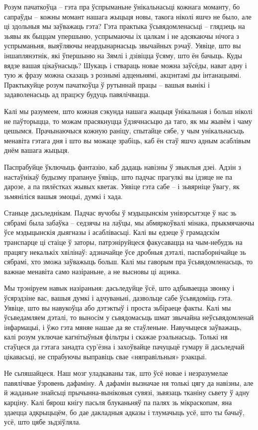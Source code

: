 Розум пачаткоўца – гэта пра ўспрыманьне ўнікальнасьці кожнага моманту, бо сапраўды – кожны момант нашага жыцьця новы, такога ніколі яшчэ не было, але ці здольныя мы заўважаць гэта? Гэта практыка ўсьвядомленасьці – глядзець на зьявы як быццам упершыню, успрымаючы іх цалкам і не адсякаючы нічога з успрыманьня, выяўляючы неардынарнасьць звычайных рэчаў. Уявіце, што вы іншаплянэтнік, які ўпершыню на Зямлі і дзівіцца ўсяму, што ён бачыць. Куды вядзе вашая цікаўнасьць? Шукаць і ствараць новае можна заўсёды, нават адну і тую ж фразу можна сказаць з рознымі адценьнямі, акцэнтамі ды інтанацыямі. Практыкуйце розум пачаткоўца ў рутыннай працы – вашыя вынікі і задаволенасьць ад працэсу будуць павялічвацца. 

Калі мы разумеем, што кожная сэкунда нашага жыцьця ўнікальная і больш ніколі не паўторыцца, то можам прасякнуцца ўдзячнасьцю да таго, як мы жывём і чаму цешымся. Прачынаючыся кожную раніцу, спытайце сябе, у чым унікальнасьць менавіта гэтага дня і што вы можаце зрабіць, каб ён стаў яшчэ адным асаблівым днём вашага жыцьця.

Паспрабуйце ўключыць фантазію, каб дадаць навізны ў звыклыя дзеі. Адзін з настаўнікаў будызму прапануе ўявіць, што падчас прагулкі вы ідзяце не па дарозе, а па пялёстках жывых кветак. Уявіце гэта сабе – і зьвярніце ўвагу, як зьмяніліся вашыя эмоцыі, думкі і хада.

Станьце дасьледнікам. Падчас вучобы ў мэдыцынскім унівэрсытэце ў нас зь сябрамі была забаўка – седзячы на лаўцы, мы абмяркоўвалі мінака, прыкмячаючы ўсе мэдыцынскія дыягназы і асаблівасьці. Калі вы едзеце ў грамадскім транспарце ці стаіце ў заторы, патрэніруйцеся факусавацца на чым-небудзь на працягу некалькіх хвілінаў: адзначайце ўсе дробныя дэталі, паспаборнічайце зь сябрамі, хто зможа заўважыць больш. Калі мы гаворым пра ўсьвядомленасьць, то важнае менавіта само назіраньне, а не высновы ці ацэнка.

Мы трэніруем навык назіраньня: дасьледуйце ўсё, што адбываецца звонку і ўсярэдзіне вас, вашыя думкі і адчуваньні, дазвольце сабе ўсьвядоміць гэта. Уявіце, што вы навукоўца або дэтэктыў і проста зьбіраеце факты. Калі мы ўсьведамляем дэталі, то выносім у сьвядомасьць шмат звычайна неўсьвядомленай інфармацыі, і ўжо гэта мяняе нашае да яе стаўленьне. Навучыцеся заўважаць, калі розум уключае кагнітыўныя фільтры і скажае рэальнасьць. Толькі ня стаўцеся да гэтага занадта сур'ёзна і захоўвайце пачуцьцё гумару й дасьледчай цікавасьці, не спрабуючы выправіць свае «няправільныя» рэакцыі.

Не сьпяшайцеся. Наш мозг уладкаваны так, што ўсё новае і незразумелае павялічвае ўзровень дафаміну. А дафамін вызначае ня толькі цягу да навізны, але й жаданьне знайсьці прычынна-выніковыя сувязі, зьвязаць тканіну сьвету ў адну карціну. Калі бярош кнігу пасьля блуканьняў па палях зь мікраскопам, яна здаецца адкрыцьцём, бо дае дакладныя адказы і тлумачыць усё, што ты бачыў, усё, што цябе зьдзіўляла. 


